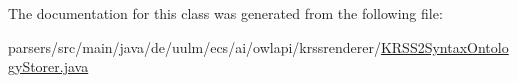 The documentation for this class was generated from the following file\-:\begin{DoxyCompactItemize}
\item 
parsers/src/main/java/de/uulm/ecs/ai/owlapi/krssrenderer/\hyperlink{_k_r_s_s2_syntax_ontology_storer_8java}{K\-R\-S\-S2\-Syntax\-Ontology\-Storer.\-java}\end{DoxyCompactItemize}
